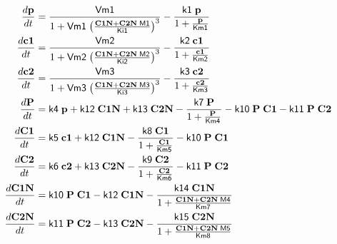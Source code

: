 \begin{table}[h]
  \centering

    \begin{align*}
\frac{d\mathrm{\bf p}}{dt} &= \frac{\mathsf{Vm1}}{1 + \mathsf{Vm1} \;
{\left(\frac{\mathrm{\bf C1N} + \mathrm{\bf C2N} \;
\mathsf{M1}}{\mathsf{Ki1}}\right)}^{3}} - \frac{\mathsf{k1} \; \mathrm{\bf p}}{1 + \frac{\mathrm{\bf p}}{\mathsf{Km1}}} \\
\frac{d\mathrm{\bf c1}}{dt} &= \frac{\mathsf{Vm2}}{1 + \mathsf{Vm2} \;
{\left(\frac{\mathrm{\bf C1N} + \mathrm{\bf C2N} \;
\mathsf{M2}}{\mathsf{Ki2}}\right)}^{3}} - \frac{\mathsf{k2} \; \mathrm{\bf c1}}{1 + \frac{\mathrm{\bf c1}}{\mathsf{Km2}}} \\
\frac{d\mathrm{\bf c2}}{dt} &= \frac{\mathsf{Vm3}}{1 + \mathsf{Vm3} \;
{\left(\frac{\mathrm{\bf C1N} + \mathrm{\bf C2N} \;
\mathsf{M3}}{\mathsf{Ki3}}\right)}^{3}} - \frac{\mathsf{k3} \; \mathrm{\bf c2}}{1 + \frac{\mathrm{\bf c2}}{\mathsf{Km3}}} \\
\frac{d\mathrm{\bf P}}{dt} &= \mathsf{k4} \; \mathrm{\bf p} + \mathsf{k12} \; \mathrm{\bf C1N} + \mathsf{k13} \; \mathrm{\bf C2N} - \frac{\mathsf{k7} \; \mathrm{\bf P}}{1 + \frac{\mathrm{\bf P}}{\mathsf{Km4}}} - \mathsf{k10} \; \mathrm{\bf P} \; \mathrm{\bf C1} - \mathsf{k11} \; \mathrm{\bf P} \; \mathrm{\bf C2} \\
\frac{d\mathrm{\bf C1}}{dt} &= \mathsf{k5} \; \mathrm{\bf c1} + \mathsf{k12} \; \mathrm{\bf C1N} - \frac{\mathsf{k8} \; \mathrm{\bf C1}}{1 + \frac{\mathrm{\bf C1}}{\mathsf{Km5}}} - \mathsf{k10} \; \mathrm{\bf P} \; \mathrm{\bf C1} \\
\frac{d\mathrm{\bf C2}}{dt} &= \mathsf{k6} \; \mathrm{\bf c2} + \mathsf{k13} \; \mathrm{\bf C2N} - \frac{\mathsf{k9} \; \mathrm{\bf C2}}{1 + \frac{\mathrm{\bf C2}}{\mathsf{Km6}}} - \mathsf{k11} \; \mathrm{\bf P} \; \mathrm{\bf C2} \\
\frac{d\mathrm{\bf C1N}}{dt} &= \mathsf{k10} \; \mathrm{\bf P} \; \mathrm{\bf C1} - \mathsf{k12} \; \mathrm{\bf C1N} - \frac{\mathsf{k14} \; \mathrm{\bf C1N}}{1 + \frac{\mathrm{\bf C1N} + \mathrm{\bf C2N} \; \mathsf{M4}}{\mathsf{Km7}}} \\
\frac{d\mathrm{\bf C2N}}{dt} &= \mathsf{k11} \; \mathrm{\bf P} \; \mathrm{\bf C2} - \mathsf{k13} \; \mathrm{\bf C2N} - \frac{\mathsf{k15} \; \mathrm{\bf C2N}}{1 + \frac{\mathrm{\bf C1N} + \mathrm{\bf C2N} \; \mathsf{M5}}{\mathsf{Km8}}} 
    \end{align*}
\end{table}


